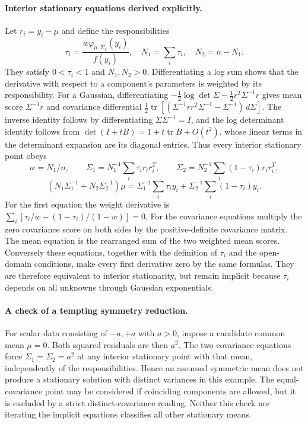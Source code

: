 \documentclass[11pt]{article}
\begin{document}
\paragraph{Interior stationary equations derived explicitly.}
Let $r_i=y_i-\mu$ and define the responsibilities
\[
\tau_i=\frac{w\varphi_{\mu,\Sigma_1}(y_i)}{f(y_i)},\quad
N_1=\sum_i\tau_i,\quad N_2=n-N_1.
\]
They satisfy $0<\tau_i<1$ and $N_1,N_2>0$.
Differentiating a log sum shows that the derivative with respect to a
component's parameters is weighted by its responsibility. For a
Gaussian, differentiating
$-\tfrac12\log\det\Sigma-\tfrac12r^T\Sigma^{-1}r$ gives mean
score $\Sigma^{-1}r$ and covariance differential
$\tfrac12\operatorname{tr}[(\Sigma^{-1}rr^T\Sigma^{-1}
-\Sigma^{-1})\,d\Sigma]$.
The inverse identity follows by differentiating
$\Sigma\Sigma^{-1}=I$, and the log determinant identity follows from
$\det(I+tB)=1+t\operatorname{tr}B+O(t^2)$, whose linear terms in
the determinant expansion are its diagonal entries.
Thus every interior stationary point obeys
\[
w=N_1/n,\qquad
\Sigma_1=N_1^{-1}\sum_i\tau_i r_i r_i^T,\qquad
\Sigma_2=N_2^{-1}\sum_i(1-\tau_i)r_i r_i^T,
\]
\[
(N_1\Sigma_1^{-1}+N_2\Sigma_2^{-1})\mu
 =\Sigma_1^{-1}\sum_i\tau_i y_i
 +\Sigma_2^{-1}\sum_i(1-\tau_i)y_i.
\]
For the first equation the weight derivative is
$\sum_i[\tau_i/w-(1-\tau_i)/(1-w)]=0$.
For the covariance equations multiply the zero covariance score on
both sides by the positive-definite covariance matrix.
The mean equation is the rearranged sum of the two weighted mean
scores. Conversely these equations, together with the definition of
$\tau_i$ and the open-domain conditions, make every first derivative
zero by the same formulas. They are therefore equivalent to interior
stationarity, but remain implicit because $\tau_i$ depends on all
unknowns through Gaussian exponentials.

\paragraph{A check of a tempting symmetry reduction.}
For scalar data consisting of $-a,+a$ with $a>0$, impose a candidate
common mean $\mu=0$. Both squared residuals are then $a^2$.
The two covariance equations force $\Sigma_1=\Sigma_2=a^2$ at any
interior stationary point with that mean, independently of the
responsibilities. Hence an assumed symmetric mean does not produce
a stationary solution with distinct variances in this example.
The equal-covariance point may be considered if coinciding components
are allowed, but it is excluded by a strict distinct-covariance reading.
Neither this check nor iterating the implicit equations classifies all
other stationary means.
\end{document}
